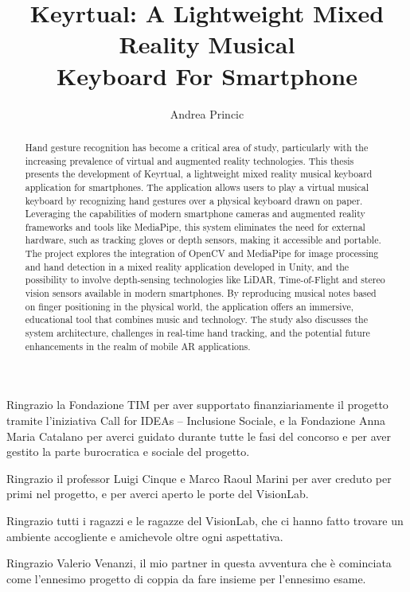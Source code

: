 \documentclass[twoside, english]{sapthesis}
\title{Keyrtual: A Lightweight Mixed Reality Musical \\Keyboard For Smartphone}
\author{Andrea Princic}
\begin{document}
	\frontmatter
	\maketitle

	\setcounter{tocdepth}{2}
	\tableofcontents

	\mainmatter

	\begin{abstract}
		Hand gesture recognition has become a critical area of study,
		particularly with the increasing prevalence of virtual and augmented reality technologies.
		This thesis presents the development of Keyrtual,
		a lightweight mixed reality musical keyboard application for smartphones.
		The application allows users to play a virtual musical keyboard by
		recognizing hand gestures over a physical keyboard drawn on paper.
		Leveraging the capabilities of modern smartphone cameras and augmented reality frameworks and tools
		like MediaPipe, this system eliminates the need for external hardware,
		such as tracking gloves or depth sensors, making it accessible and portable.
		The project explores the integration of OpenCV and MediaPipe for image processing and hand detection
		in a mixed reality application developed in Unity,
		and the possibility to involve depth-sensing technologies like LiDAR, Time-of-Flight
		and stereo vision sensors available in modern smartphones.
		By reproducing musical notes based on finger positioning in the physical world,
		the application offers an immersive, educational tool that combines music and technology.
		The study also discusses the system architecture, challenges in real-time hand tracking,
		and the potential future enhancements in the realm of mobile AR applications.
	\end{abstract}

	\begin{acknowledgments}[Ringraziamenti]
		Ringrazio la Fondazione TIM per aver supportato finanziariamente il progetto tramite l'iniziativa
		Call for IDEAs -- Inclusione Sociale, e la Fondazione Anna Maria Catalano per averci guidato
		durante tutte le fasi del concorso e per aver gestito la parte burocratica e sociale del progetto.

		Ringrazio il professor Luigi Cinque e Marco Raoul Marini per aver creduto per primi nel progetto,
		e per averci aperto le porte del VisionLab.

		Ringrazio tutti i ragazzi e le ragazze del VisionLab,
		che ci hanno fatto trovare un ambiente accogliente e amichevole oltre ogni aspettativa.

		Ringrazio Valerio Venanzi, il mio partner in questa avventura che è cominciata come
		l'ennesimo progetto di coppia da fare insieme per l'ennesimo esame.
	\end{acknowledgments}
\end{document}
